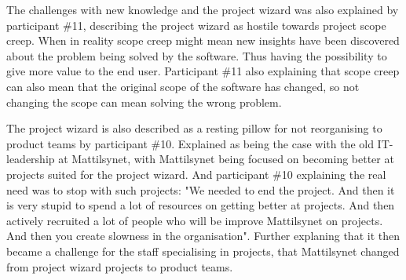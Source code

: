 
The challenges with new knowledge and the project wizard was also explained by participant \#11, describing the project wizard as hostile towards project scope creep. When in reality scope creep might mean new insights have been discovered about the problem being solved by the software. Thus having the possibility to give more value to the end user. Participant \#11 also explaining that scope creep can also mean that the original scope of the software has changed, so not changing the scope can mean solving the wrong problem.


The project wizard is also described as a resting pillow for not reorganising to product teams by participant \#10. Explained as being the case with the old IT-leadership at Mattilsynet, with Mattilsynet being focused on becoming better at projects suited for the project wizard. And participant \#10 explaining the real need was to stop with such projects: "We needed to end the project. And then it is very stupid to spend a lot of resources on getting better at projects. And then actively recruited a lot of people who will be improve Mattilsynet on projects. And then you create slowness in the organisation". Further explaning that it then became a challenge for the staff specialising in projects, that Mattilsynet changed from project wizard projects to product teams.

